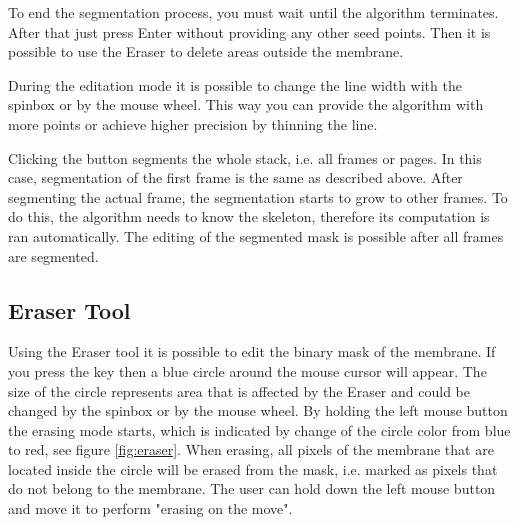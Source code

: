 To end the segmentation process, you must wait until the algorithm terminates. After that just press Enter without providing any other seed points. Then it is possible to use the Eraser to delete areas outside the membrane.

During the editation mode it is possible to change the line width with the spinbox  or by the mouse wheel. This way you can provide the algorithm with more points or achieve higher precision by thinning the line.

Clicking the button  segments the whole stack, i.e. all frames or pages. In this case, segmentation of the first frame is the same as described above. After segmenting the actual frame, the segmentation starts to grow to other frames. To do this, the algorithm needs to know the skeleton, therefore its computation is ran automatically. The editing of the segmented mask is possible after all frames are segmented.

\subsection{Eraser Tool}
Using the Eraser tool it is possible to edit the binary mask of the membrane. If you press the key  then a blue circle around the mouse cursor will appear. The size of the circle represents area that is affected by the Eraser and could be changed by the spinbox  or by the mouse wheel. By holding the left mouse button the erasing mode starts, which is indicated by change of the circle color from blue to red, see figure \ref{fig:eraser}. When erasing, all pixels of the membrane that are located inside the circle will be erased from the mask, i.e. marked as pixels that do not belong to the membrane. The user can hold down the left mouse button and move it to perform "erasing on the move".

